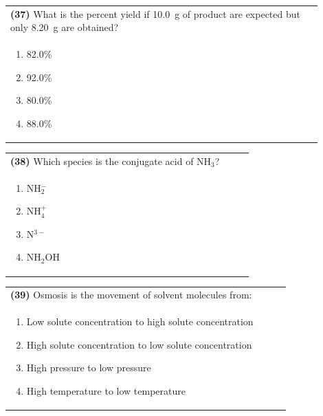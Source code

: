 \documentclass{article}
\begin{document}
\noindent\begin{tabular}{|p{0.9\linewidth}|}
\hline
\textbf{(37)} What is the percent yield if 10.0~g of product are expected but only 8.20~g are obtained?\\[0.2cm]

\begin{minipage}[t]{0.85\linewidth}
\begin{enumerate}[label=\alph*.]
\item 82.0\%
\item 92.0\%
\item 80.0\%
\item 88.0\%
\end{enumerate}
\end{minipage}\\[0.2cm]
\hline
\end{tabular}

\noindent\begin{tabular}{|p{0.9\linewidth}|}
\hline
\textbf{(38)} Which species is the conjugate acid of NH$_3$? \\[0.2cm]
\begin{minipage}{0.85\linewidth}
\begin{enumerate}[label=\alph*.]
\item NH$_2^-$ \item NH$_4^+$ \item N$^{3-}$ \item NH$_2$OH
\end{enumerate}
\end{minipage}\\[0.2cm]
\hline
\end{tabular}

\noindent\begin{tabular}{|p{0.9\linewidth}|}
\hline
\textbf{(39)} Osmosis is the movement of solvent molecules from:\\[0.2cm]
\begin{minipage}[t]{0.85\linewidth}
\begin{enumerate}[label=\alph*.]
\item Low solute concentration to high solute concentration
\item High solute concentration to low solute concentration
\item High pressure to low pressure
\item High temperature to low temperature
\end{enumerate}
\end{minipage}\\[0.2cm]
\hline
\end{tabular}
\end{document}
